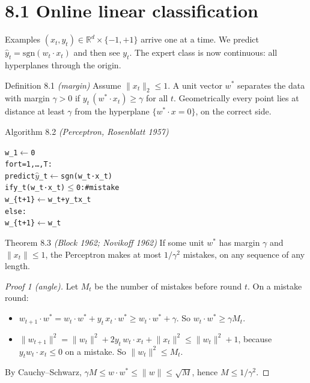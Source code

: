 \documentclass[11pt,a4paper,openany]{book}
\newcommand{\R}{\mathbb{R}}
\newcommand{\norm}[1]{\lVert #1\rVert}
\newcommand{\hy}{\hat{y}}
\newenvironment{algo}{\par\smallskip\begingroup\footnotesize\begin{alltt}}{\end{alltt}\endgroup\smallskip}
\begin{document}
\section*{8.1 Online linear classification}\label{ch8-setup}

Examples $(x_t,y_t)\in\R^d\times\{-1,+1\}$ arrive one at a time. We predict $\hy_t=\mathrm{sgn}(w_t\cdot x_t)$ and then see $y_t$. The expert class is now continuous: all hyperplanes through the origin.

\begin{bdef}{Definition 8.1 \emph{(margin)}}
Assume $\norm{x_t}_2\le1$. A unit vector $w^*$ separates the data with margin $\gamma>0$ if $y_t\,(w^*\cdot x_t)\ge\gamma$ for all $t$. Geometrically every point lies at distance at least $\gamma$ from the hyperplane $\{w^*\cdot x=0\}$, on the correct side.
\end{bdef}

\begin{balg}{Algorithm 8.2 \emph{(Perceptron, Rosenblatt 1957)}}
\begin{algo}
w\_1 \ensuremath{\leftarrow} 0
for t = 1, …, T:
    predict \ensuremath{\hat{y}}\_t \ensuremath{\leftarrow} sgn(w\_t · x\_t)
    if y\_t (w\_t · x\_t) \ensuremath{\le} 0:          \# mistake
        w\_\{t+1\} \ensuremath{\leftarrow} w\_t + y\_t x\_t
    else:
        w\_\{t+1\} \ensuremath{\leftarrow} w\_t
\end{algo}
\end{balg}

\begin{bthm}{Theorem 8.3 \emph{(Block 1962; Novikoff 1962)}}
If some unit $w^*$ has margin $\gamma$ and $\norm{x_t}\le1$, the Perceptron makes at most $1/\gamma^2$ mistakes, on any sequence of any length.
\end{bthm}

\begin{proof}[Proof 1 (angle)]
Let $M_t$ be the number of mistakes before round $t$. On a mistake round:

\begin{itemize}
\item $w_{t+1}\cdot w^*=w_t\cdot w^*+y_t\,x_t\cdot w^*\ge w_t\cdot w^*+\gamma$. So $w_t\cdot w^*\ge\gamma M_t$.
\item $\norm{w_{t+1}}^2=\norm{w_t}^2+2y_t\,w_t\cdot x_t+\norm{x_t}^2\le\norm{w_t}^2+1$, because $y_tw_t\cdot x_t\le0$ on a mistake. So $\norm{w_t}^2\le M_t$.
\end{itemize}

By Cauchy–Schwarz, $\gamma M\le w\cdot w^*\le\norm w\le\sqrt M$, hence $M\le1/\gamma^2$.
\end{proof}
\end{document}

